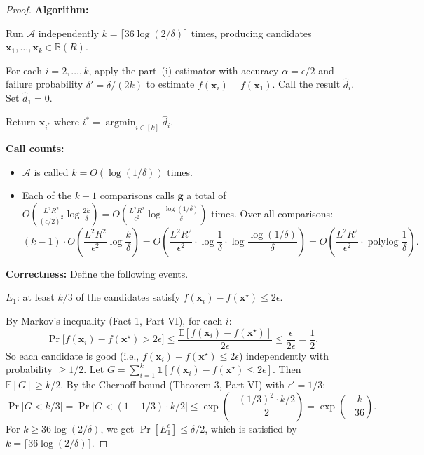 \documentclass[12pt]{article}
\begin{document}
\begin{proof}
\textbf{Algorithm:}

Run $\mathcal{A}$ independently $k = \lceil 36\log(2/\delta) \rceil$ times, producing candidates $\mathbf{x}_1, \ldots, \mathbf{x}_k \in \mathbb{B}(R)$.

For each $i = 2, \ldots, k$, apply the part~(i) estimator with accuracy $\alpha = \epsilon/2$ and failure probability $\delta' = \delta/(2k)$ to estimate $f(\mathbf{x}_i) - f(\mathbf{x}_1)$. Call the result $\hat{d}_i$. Set $\hat{d}_1 = 0$.

Return $\mathbf{x}_{i^*}$ where $i^* = \operatorname{argmin}_{i \in [k]} \hat{d}_i$.

\medskip
\textbf{Call counts:}
\begin{itemize}
\item $\mathcal{A}$ is called $k = O(\log(1/\delta))$ times.
\item Each of the $k - 1$ comparisons calls $\mathbf{g}$ a total of $O\!\left(\frac{L^2R^2}{(\epsilon/2)^2}\log\frac{2k}{\delta}\right) = O\!\left(\frac{L^2R^2}{\epsilon^2}\log\frac{\log(1/\delta)}{\delta}\right)$ times. Over all comparisons:
\[
(k-1) \cdot O\!\left(\frac{L^2R^2}{\epsilon^2}\log\frac{k}{\delta}\right) = O\!\left(\frac{L^2R^2}{\epsilon^2}\cdot\log\frac{1}{\delta}\cdot\log\frac{\log(1/\delta)}{\delta}\right) = O\!\left(\frac{L^2R^2}{\epsilon^2}\cdot\operatorname{polylog}\frac{1}{\delta}\right).
\]
\end{itemize}

\textbf{Correctness:}
Define the following events.

$E_1$: at least $k/3$ of the candidates satisfy $f(\mathbf{x}_i) - f(\mathbf{x}^\star) \leq 2\epsilon$.

By Markov's inequality (Fact 1, Part VI), for each $i$:
\[
\Pr\bigl[f(\mathbf{x}_i) - f(\mathbf{x}^\star) > 2\epsilon\bigr] \leq \frac{\mathbb{E}[f(\mathbf{x}_i) - f(\mathbf{x}^\star)]}{2\epsilon} \leq \frac{\epsilon}{2\epsilon} = \frac{1}{2}.
\]
So each candidate is good (i.e., $f(\mathbf{x}_i) - f(\mathbf{x}^\star) \leq 2\epsilon$) independently with probability $\geq 1/2$. Let $G = \sum_{i=1}^k \mathbf{1}[f(\mathbf{x}_i) - f(\mathbf{x}^\star) \leq 2\epsilon]$. Then $\mathbb{E}[G] \geq k/2$. By the Chernoff bound (Theorem 3, Part VI) with $\epsilon' = 1/3$:
\[
\Pr\bigl[G < k/3\bigr] = \Pr\bigl[G < (1-1/3) \cdot k/2\bigr] \leq \exp\!\left(-\frac{(1/3)^2 \cdot k/2}{2}\right) = \exp\!\left(-\frac{k}{36}\right).
\]
For $k \geq 36\log(2/\delta)$, we get $\Pr[E_1^c] \leq \delta/2$, which is satisfied by $k = \lceil 36\log(2/\delta) \rceil$.


\end{proof}
\end{document}
